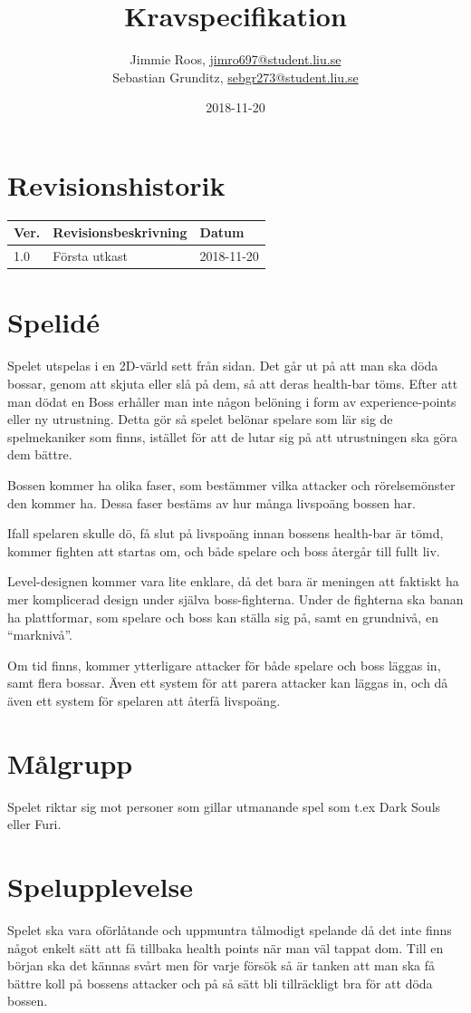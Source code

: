 \documentclass{TDP005mall}
\author{Jimmie Roos, \url{jimro697@student.liu.se}\\
  Sebastian Grunditz, \url{sebgr273@student.liu.se}}
\title{Kravspecifikation}
\date{2018-11-20}
\begin{document}
\projectpage
\section{Revisionshistorik}
\begin{table}[!h]
\begin{tabularx}{\linewidth}{|l|X|l|}
\hline
Ver. & Revisionsbeskrivning & Datum \\\hline
1.0 & Första utkast & 2018-11-20 \\\hline
\end{tabularx}
\end{table}


\section{Spelidé}
Spelet utspelas i en 2D-värld sett från sidan. Det går ut på att man ska döda bossar,
genom att skjuta eller slå på dem, så att deras health-bar töms. Efter att man dödat
en Boss erhåller man inte någon belöning i form av experience-points eller ny
utrustning. Detta gör så spelet belönar spelare som lär sig de spelmekaniker som finns,
istället för att de lutar sig på att utrustningen ska göra dem bättre.

Bossen kommer ha olika faser, som bestämmer vilka attacker och rörelsemönster den kommer ha.
Dessa faser bestäms av hur många livspoäng bossen har.

Ifall spelaren skulle dö, få slut på livspoäng innan bossens health-bar är tömd,
kommer fighten att startas om, och både spelare och boss återgår till fullt liv.

Level-designen kommer vara lite enklare, då det bara är meningen att faktiskt ha
mer komplicerad design under själva boss-fighterna. Under de fighterna ska banan
ha plattformar, som spelare och boss kan ställa sig på, samt en grundnivå, en \enquote{marknivå}.

Om tid finns, kommer ytterligare attacker för både spelare och boss läggas in, samt flera bossar.
Även ett system för att parera attacker kan läggas in, och då även ett system för
spelaren att återfå livspoäng.

\section{Målgrupp}
Spelet riktar sig mot personer som gillar utmanande spel som t.ex Dark Souls
eller Furi.

\section{Spelupplevelse}
Spelet ska vara oförlåtande och uppmuntra tålmodigt spelande då det inte finns
något enkelt sätt att få tillbaka health points när man väl tappat dom. Till en
början ska det kännas svårt men för varje försök så är tanken att man ska få
bättre koll på bossens attacker och på så sätt bli tillräckligt bra för att
döda bossen.
\end{document}
